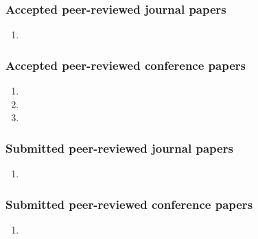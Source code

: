 \subsubsection{Accepted peer-reviewed journal papers}
\begin{enumerate}
	\item {}
\end{enumerate}

\subsubsection{Accepted peer-reviewed conference papers}
\begin{enumerate}
	\item {}
	\item {}
	\item {}
\end{enumerate}

\subsubsection{Submitted peer-reviewed journal papers}
\begin{enumerate}
	\item {}
\end{enumerate}

\subsubsection{Submitted peer-reviewed conference papers}
\begin{enumerate}
    \item {}
\end{enumerate}
